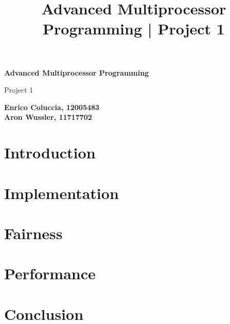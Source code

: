 \documentclass[12pt,a4paper]{article}
\begin{document}
\title{Advanced Multiprocessor Programming | Project 1}

\begin{titlepage}
    \begin{center}
        \vspace*{1cm}

        \Huge
        \textbf{Advanced Multiprocessor Programming}

        \vspace{0.5cm}
        \LARGE
        Project 1 \\

        \vspace{1.5cm}

        \small
        \textbf{Enrico Coluccia, 12005483\\ Aron Wussler, 11717702}

        \vfill

        \vspace{0.8cm}


    \end{center}
\end{titlepage}

\section{Introduction}


\newpage
\section{Implementation}


\newpage
\section{Fairness}


\section{Performance}


\newpage
\section{Conclusion}


\newpage
\printbibliography
\end{document}
